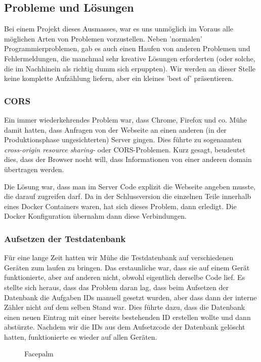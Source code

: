 \subsection{Probleme und Lösungen}

Bei einem Projekt dieses Ausmasses, war es uns unmöglich im Voraus alle möglichen Arten von Problemen vorzustellen. Neben 'normalen' Programmierproblemen, gab es auch einen Haufen von anderen Problemen und Fehlermeldungen, die manchmal sehr kreative Lösungen erforderten (oder solche, die im Nachhinein als richtig dumm sich erpuppten). Wir werden an dieser Stelle keine komplette Aufzählung liefern, aber ein kleines 'best of' präsentieren.

\subsubsection{CORS} 
Ein immer wiederkehrendes Problem war, dass Chrome, Firefox und co. Mühe damit hatten, dass Anfragen von der Webseite an einen anderen (in der Produktionsphase ungesichterten) Server gingen. Dies führte zu sogenannten \emph{cross-origin resource sharing-} oder CORS-Problemen. Kurz gesagt, beudeutet dies, dass der Browser nocht will, dass Informationen von einer anderen domain übertragen werden.

Die Lösung war, dass man im Server Code explizit die Webseite angeben musste, die darauf zugreifen darf. Da in der Schlussversion die einzelnen Teile innerhalb eines Docker Containers waren, hat sich dieses Problem, dann erledigt. Die Docker Konfiguration übernahm dann diese Verbindungen.

\subsubsection{Aufsetzen der Testdatenbank}
Für eine lange Zeit hatten wir Mühe die Testdatenbank auf verschiedenen Geräten zum laufen zu bringen. Das erstaunliche war, dass sie auf einem Gerät funktionierte, aber auf anderen nicht, obwohl eigentlich derselbe Code lief. Es stellte sich heraus, dass das Problem daran lag, dass beim Aufsetzen der Datenbank die Aufgaben IDs manuell gesetzt wurden, aber dass dann der interne Zähler nicht auf dem selben Stand war. Dies führte dazu, dass die Datenbank einen neuen Eintrag mit einer bereits bestehenden ID erstellen wollte und dann abstürzte. Nachdem wir die IDs aus dem Aufsetzcode der Datenbank gelöscht hatten, funktionierte es wieder auf allen Geräten.

\begin{figure}[ht]
    \caption{Facepalm \cite{fig:facepalm}}
\end{figure}

